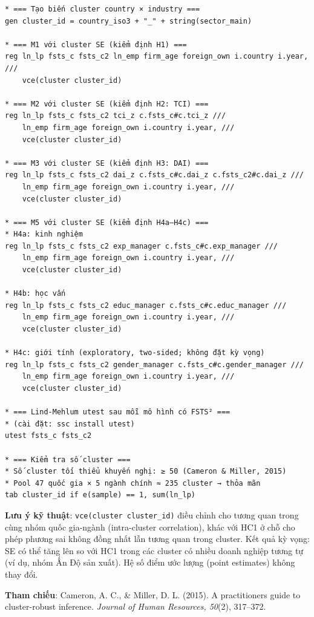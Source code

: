 \documentclass[12pt,a4paper]{article}
\begin{document}
\begin{verbatim}
* === Tạo biến cluster country × industry ===
gen cluster_id = country_iso3 + "_" + string(sector_main)

* === M1 với cluster SE (kiểm định H1) ===
reg ln_lp fsts_c fsts_c2 ln_emp firm_age foreign_own i.country i.year, ///
    vce(cluster cluster_id)

* === M2 với cluster SE (kiểm định H2: TCI) ===
reg ln_lp fsts_c fsts_c2 tci_z c.fsts_c#c.tci_z ///
    ln_emp firm_age foreign_own i.country i.year, ///
    vce(cluster cluster_id)

* === M3 với cluster SE (kiểm định H3: DAI) ===
reg ln_lp fsts_c fsts_c2 dai_z c.fsts_c#c.dai_z c.fsts_c2#c.dai_z ///
    ln_emp firm_age foreign_own i.country i.year, ///
    vce(cluster cluster_id)

* === M5 với cluster SE (kiểm định H4a–H4c) ===
* H4a: kinh nghiệm
reg ln_lp fsts_c fsts_c2 exp_manager c.fsts_c#c.exp_manager ///
    ln_emp firm_age foreign_own i.country i.year, ///
    vce(cluster cluster_id)

* H4b: học vấn
reg ln_lp fsts_c fsts_c2 educ_manager c.fsts_c#c.educ_manager ///
    ln_emp firm_age foreign_own i.country i.year, ///
    vce(cluster cluster_id)

* H4c: giới tính (exploratory, two-sided; không đặt kỳ vọng)
reg ln_lp fsts_c fsts_c2 gender_manager c.fsts_c#c.gender_manager ///
    ln_emp firm_age foreign_own i.country i.year, ///
    vce(cluster cluster_id)

* === Lind-Mehlum utest sau mỗi mô hình có FSTS² ===
* (cài đặt: ssc install utest)
utest fsts_c fsts_c2

* === Kiểm tra số cluster ===
* Số cluster tối thiểu khuyến nghị: ≥ 50 (Cameron & Miller, 2015)
* Pool 47 quốc gia × 5 ngành chính ≈ 235 cluster → thỏa mãn
tab cluster_id if e(sample) == 1, sum(ln_lp)
\end{verbatim}

\textbf{Lưu ý kỹ thuật}: \texttt{vce(cluster\ cluster\_id)} điều chỉnh
cho tương quan trong cùng nhóm quốc gia-ngành (intra-cluster
correlation), khác với HC1 ở chỗ cho phép phương sai không đồng nhất lẫn
tương quan trong cluster. Kết quả kỳ vọng: SE có thể tăng lên so với HC1
trong các cluster có nhiều doanh nghiệp tương tự (ví dụ, nhóm Ấn Độ sản
xuất). Hệ số điểm ước lượng (point estimates) không thay đổi.

\textbf{Tham chiếu}: Cameron, A. C., \& Miller, D. L. (2015). A
practitioner\textquotesingle s guide to cluster-robust inference.
\emph{Journal of Human Resources, 50}(2), 317--372.
\end{document}
